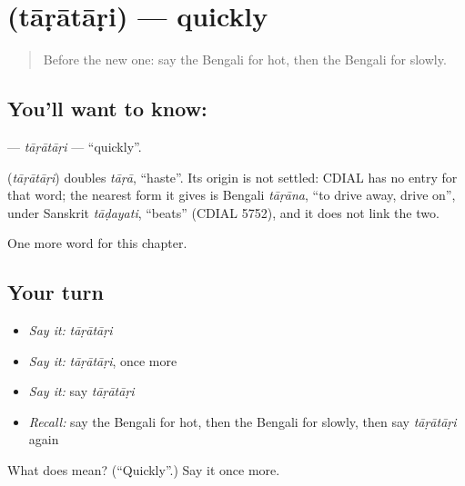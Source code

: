 \section[\texorpdfstring{\bn{তাড়াতাড়ি} (tāṛātāṛi)}{তাড়াতাড়ি (tāṛātāṛi)}]{ (tāṛātāṛi) — quickly}

\label{lesson:BN-C73-taratari}



\begin{quote}
Before the new one: say the Bengali for hot, then the Bengali for slowly.
\end{quote}

\subsection*{You'll want to know: }
\textbf{} — \emph{tāṛātāṛi} — \textquotedblleft{}quickly\textquotedblright{}.

\begin{cousinweb}
\textbf{} (\emph{tāṛātāṛi}) doubles \emph{tāṛā}, \textquotedblleft{}haste\textquotedblright{}. Its origin is not settled: CDIAL has no entry for that word; the nearest form it gives is Bengali \emph{tāṛāna}, \textquotedblleft{}to drive away, drive on\textquotedblright{}, under Sanskrit \emph{tāḍayati}, \textquotedblleft{}beats\textquotedblright{} (CDIAL 5752), and it does not link the two.
\end{cousinweb}

\begin{grammarlens}[title={What you've built}]
One more word for this chapter.
\end{grammarlens}

\subsection*{Your turn}
\begin{itemize}
\raggedright
  \item \emph{Say it:} \emph{tāṛātāṛi}
  \item \emph{Say it:} \emph{tāṛātāṛi}, once more
  \item \emph{Say it:} say \emph{tāṛātāṛi}
  \item \emph{Recall:} say the Bengali for hot, then the Bengali for slowly, then say \emph{tāṛātāṛi} again
\end{itemize}

\begin{tcolorbox}[breakable,colback=teal!4,colframe=teal!35!black,title={Before you move on}]
What does  mean? (\textquotedblleft{}Quickly\textquotedblright{}.) Say it once more.
\end{tcolorbox}
